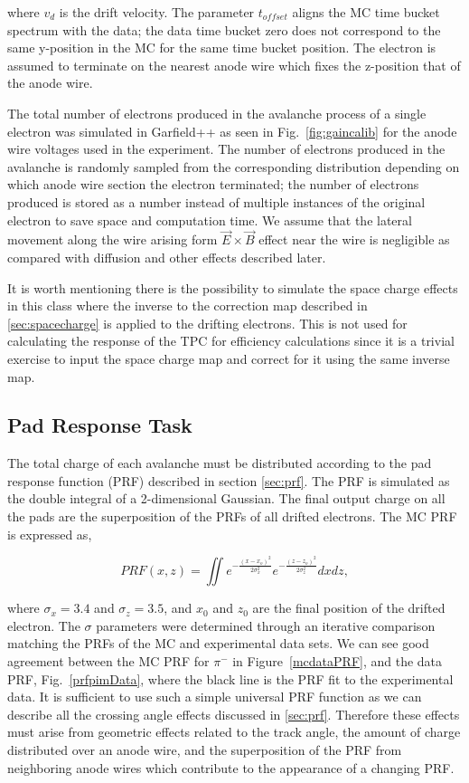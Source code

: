  where $v_d$ is the drift velocity. The parameter $t_{offset}$ aligns the MC time bucket spectrum with the data; the data time bucket zero does not correspond to the same y-position in the MC for the same time bucket position. The electron is assumed to terminate on the nearest anode wire which fixes the z-position that of the anode wire. 

The total number of electrons produced in the avalanche process of a single electron was simulated in Garfield++ as seen in Fig.~\ref{fig:gaincalib} for the anode wire voltages used in the experiment. The number of electrons produced in the avalanche is randomly sampled from the corresponding distribution depending on which anode wire section the electron terminated; the number of electrons produced is stored as a number instead of multiple instances of the original electron to save space and computation time. We assume that the lateral movement along the wire arising form $\vec{E}\times\vec{B}$ effect near the wire is negligible as compared with diffusion and other effects described later. 

It is worth mentioning there is the possibility to simulate the space charge effects in this class where the inverse to the correction map described in \ref{sec:spacecharge} is applied to the drifting electrons. This is not used for calculating the response of the TPC for efficiency calculations since it is a trivial exercise to input the space charge map and correct for it using the same inverse map.  

\subsection{Pad Response Task}
The total charge of each avalanche must be distributed according to the pad response function (PRF) described in section \ref{sec:prf}. The PRF is simulated as the double integral of a 2-dimensional Gaussian. The final output charge on all the pads are the superposition of the PRFs of all drifted electrons. The MC PRF is expressed as, 

\begin{equation}
PRF(x,z) = \iint e^{-\frac{(x-x_o)^2}{2\sigma_x^2}} e^{-\frac{(z-z_o)^2}{2\sigma_z^2}}dxdz,
\end{equation}

where $\sigma_x = 3.4$ and $\sigma_z = 3.5$, and $x_0$ and $z_0$ are the final position of the drifted electron. The $\sigma$ parameters were determined through an iterative comparison matching the PRFs of the MC and experimental data sets. We can see good agreement between the MC PRF for $\pi^-$ in Figure~\ref{mcdataPRF}, and the data PRF, Fig.~\ref{prfpimData}, where the black line is the PRF fit to the experimental data. It is sufficient to use such a simple universal PRF function as we can describe all the crossing angle effects discussed in \ref{sec:prf}. Therefore these effects must arise from geometric effects related to the track angle, the amount of charge distributed over an anode wire, and the superposition of the PRF from neighboring anode wires which contribute to the appearance of a changing PRF.

